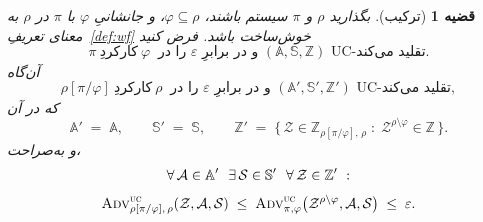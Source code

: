 \documentclass[10pt,oneside,openany]{book}
\newcommand{\Zenv}{\mathcal{Z}}
\newcommand{\Adv}{\mathcal{A}}
\newcommand{\Sim}{\mathcal{S}}
\newcommand{\advtg}{\op{Adv}}
\newcommand{\Aset}{\mathbb{A}}
\newcommand{\SimSet}{\mathbb{S}}
\newcommand{\ZenvSet}{\mathbb{Z}}
\newcommand{\op}[1]{\textnormal{\textsc{#1}}}
\theoremstyle{accentdef}
\theoremstyle{accentplain}
\newtheorem{theorem}[definition]{قضیه}
\begin{document}
\begin{theorem}[ترکیب]\label{thm:comp}
بگذارید $\rho$ و $\pi$ سیستم باشند، $\varphi \subseteq \rho$، و جانشانیِ
$\varphi$ با $\pi$ در $\rho$ به معنای تعریفِ~\ref{def:wf} خوش‌ساخت باشد.
فرض کنید
\[
  \pi \ \text{کارکردِ} \ \varphi \ \text{ را در } \varepsilon \text{ و در برابرِ } (\Aset,\SimSet,\ZenvSet) \text{ UC-تقلید می‌کند} .
\]
آن‌گاه
\[
  \rho[\pi/\varphi] \ \text{کارکردِ} \ \rho \ \text{ را در } \varepsilon \text{ و در برابرِ } (\Aset',\SimSet',\ZenvSet') \text{ UC-تقلید می‌کند} ,
\]
که در آن
\[
  \Aset' \;=\; \Aset, \qquad
  \SimSet' \;=\; \SimSet, \qquad
  \ZenvSet' \;=\; \bigl\{\, \Zenv \in \ZenvSet_{\rho[\pi/\varphi],\,\rho} \;:\; \Zenv^{\rho \setminus \varphi} \in \ZenvSet \,\bigr\} .
\]
و به‌صراحت،
\[
  \begin{gathered}
  \forall\, \Adv \in \Aset' \ \ \exists\, \Sim \in \SimSet' \ \ \forall\, \Zenv \in \ZenvSet' \ : \\[3pt]
  \advtg^{\op{uc}}_{\rho[\pi/\varphi],\,\rho}(\Zenv,\Adv,\Sim)
  \;\leq\;
  \advtg^{\op{uc}}_{\pi,\varphi}\bigl(\Zenv^{\rho \setminus \varphi},\Adv,\Sim\bigr)
  \;\leq\; \varepsilon .
  \end{gathered}
\]
\end{theorem}
\end{document}
